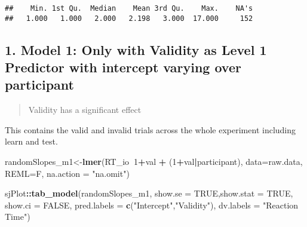 \documentclass[
]{article}
\newenvironment{Shaded}{\begin{snugshade}}{\end{snugshade}}
\newcommand{\CommentTok}[1]{\textcolor[rgb]{0.56,0.35,0.01}{\textit{#1}}}
\newcommand{\DataTypeTok}[1]{\textcolor[rgb]{0.13,0.29,0.53}{#1}}
\newcommand{\DecValTok}[1]{\textcolor[rgb]{0.00,0.00,0.81}{#1}}
\newcommand{\KeywordTok}[1]{\textcolor[rgb]{0.13,0.29,0.53}{\textbf{#1}}}
\newcommand{\NormalTok}[1]{#1}
\newcommand{\OperatorTok}[1]{\textcolor[rgb]{0.81,0.36,0.00}{\textbf{#1}}}
\newcommand{\OtherTok}[1]{\textcolor[rgb]{0.56,0.35,0.01}{#1}}
\newcommand{\StringTok}[1]{\textcolor[rgb]{0.31,0.60,0.02}{#1}}
\begin{document}
\begin{Shaded}
\end{Shaded}

\begin{verbatim}
##    Min. 1st Qu.  Median    Mean 3rd Qu.    Max.    NA's 
##   1.000   1.000   2.000   2.198   3.000  17.000     152
\end{verbatim}

\hypertarget{model-1-only-with-validity-as-level-1-predictor-with-intercept-varying-over-participant}{%
\subsection{1. Model 1: Only with Validity as Level 1 Predictor with
intercept varying over
participant}\label{model-1-only-with-validity-as-level-1-predictor-with-intercept-varying-over-participant}}

\begin{quote}
Validity has a significant effect
\end{quote}

This contains the valid and invalid trials across the whole experiment
including learn and test.

\begin{Shaded}
\begin{Highlighting}[]
\NormalTok{randomSlopes_m1<-}\KeywordTok{lmer}\NormalTok{(RT_io}\OperatorTok{~}\DecValTok{1}\OperatorTok{+}\NormalTok{val }\OperatorTok{+}\StringTok{ }\NormalTok{(}\DecValTok{1}\OperatorTok{+}\NormalTok{val}\OperatorTok{|}\NormalTok{participant), }
                      \DataTypeTok{data=}\NormalTok{raw.data, }
                      \DataTypeTok{REML=}\NormalTok{F,}
                      \DataTypeTok{na.action =} \StringTok{"na.omit"}\NormalTok{)}



\NormalTok{sjPlot}\OperatorTok{::}\KeywordTok{tab_model}\NormalTok{(randomSlopes_m1, }\DataTypeTok{show.se =} \OtherTok{TRUE}\NormalTok{,}\DataTypeTok{show.stat =} \OtherTok{TRUE}\NormalTok{, }\DataTypeTok{show.ci =} \OtherTok{FALSE}\NormalTok{, }
                  \DataTypeTok{pred.labels =} \KeywordTok{c}\NormalTok{(}\StringTok{"Intercept"}\NormalTok{,}\StringTok{"Validity"}\NormalTok{),}
                  \DataTypeTok{dv.labels =} \StringTok{"Reaction Time"}\NormalTok{)}
\end{Highlighting}
\end{Shaded}
\end{document}
